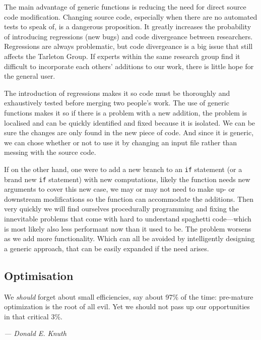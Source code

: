 The main advantage of generic functions is reducing the need for direct source code modification. Changing source code, especially when there are no automated tests to speak of, is a dangerous proposition. It greatly increases the probability of introducing regressions (new bugs) and code divergeance between researchers. Regressions are always problematic, but code divergeance is a big issue that still affects the Tarleton Group. If experts within the same research group find it difficult to incorporate each others' additions to our work, there is little hope for the general user.

The introduction of regressions makes it so code must be thoroughly and exhaustively tested before merging two people's work. The use of generic functions makes it so if there is a problem with a new addition, the problem is localised and can be quickly identified and fixed because it is isolated. We can be sure the changes are only found in the new piece of code. And since it is generic, we can chose whether or not to use it by changing an input file rather than messing with the source code.

If on the other hand, one were to add a new branch to an \texttt{if} statement (or a brand new \texttt{if} statement) with new computations, likely the function needs new arguments to cover this new case, we may or may not need to make up- or downstream modifications so the function can accommodate the additions. Then very quickly we will find ourselves procedurally programming and fixing the innevitable problems that come with hard to understand spaghetti code---which is most likely also less performant now than it used to be. The problem worsens as we add more functionality. Which can all be avoided by intelligently designing a generic approach, that can be easily expanded if the need arises.

\subsection{Optimisation}
\renewcommand{\epigraphflush}{flushright}
\renewcommand{\textflush}{flushright}
\setlength{\epigraphwidth}{0.75\linewidth}
\epigraph{We \emph{should} forget about small efficiencies, say about 97\% of the time: pre-mature optimization is the root of all evil. Yet we should not pass up our opportunities in that critical 3\%.}{\textit{--- Donald E. Knuth \cite[p.~268]{knuth1974structured}}}

